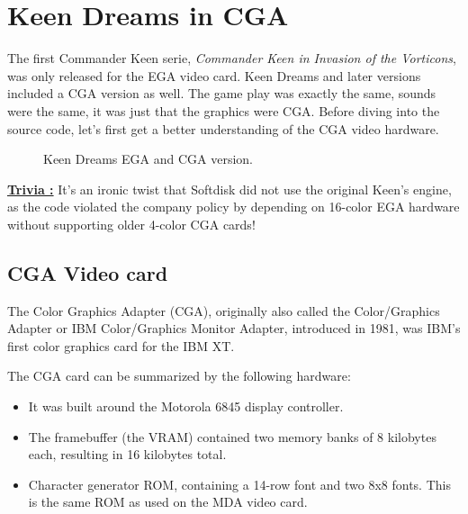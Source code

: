 \documentclass[book.tex]{subfiles}
\begin{document}
\section{Keen Dreams in CGA}
The first Commander Keen serie, \textit{Commander Keen in Invasion of the Vorticons}, was only released for the EGA video card. Keen Dreams and later versions included a CGA version as well. The game play was exactly the same, sounds were the same, it was just that the graphics were CGA. Before diving into  the source code, let's first get a better understanding of the CGA video hardware.\\


\begin{figure}[H] 
  \centering 
  \caption{Keen Dreams EGA and CGA version.}
\end{figure}

\bigskip
\par
\textbf{\underline{Trivia :}} It's an ironic twist that Softdisk did not use the original Keen's engine, as the code violated the company policy by depending on 16-color EGA hardware without supporting older 4-color CGA cards!\\
\par


 

\subsection{CGA Video card}
The Color Graphics Adapter (CGA), originally also called the Color/Graphics Adapter or IBM Color/Graphics Monitor Adapter, introduced in 1981, was IBM's first color graphics card for the IBM XT.\\
\par
The CGA card can be summarized by the following hardware:
\begin{itemize}
  \item It was built around the Motorola 6845 display controller.
  \item The framebuffer (the VRAM) contained two memory banks of 8 kilobytes each, resulting in 16 kilobytes total.
  \item Character generator ROM, containing a 14-row font and two 8x8 fonts. This is the same ROM as used on the MDA video card.
\end{itemize}
\end{document}
